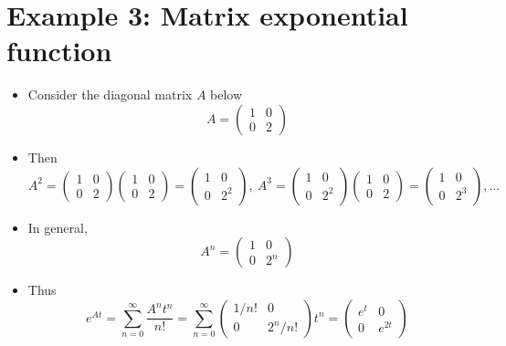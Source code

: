 \documentclass[11pt,a4paper]{article}
\begin{document}
	\section*{Example 3: Matrix exponential function}
	\begin{itemize}
		\item Consider the diagonal matrix $A$ below
		$$
		A =
		\begin{pmatrix}
			1 & 0\\
			0 & 2
		\end{pmatrix}
		$$
		\item Then
		$$
		A^2 = 
		\begin{pmatrix}
			1 & 0\\
			0 & 2
		\end{pmatrix}
		\begin{pmatrix}
			1 & 0\\
			0 & 2
		\end{pmatrix} = 
		\begin{pmatrix}
			1 & 0\\
			0 & 2^2
		\end{pmatrix},\ A^3=
		\begin{pmatrix}
			1 & 0\\
			0 & 2^2
		\end{pmatrix}
		\begin{pmatrix}
			1 & 0\\
			0 & 2
		\end{pmatrix} =
		\begin{pmatrix}
			1 & 0\\
			0 & 2^3
		\end{pmatrix},\ldots
		$$
		\item In general,
		$$
		A^n =
		\begin{pmatrix}
			1 & 0\\
			0 & 2^n
		\end{pmatrix}
		$$
		\item Thus
		$$
		e^{At} = \sum_{n=0}^{\infty}\frac{A^nt^n}{n!} = \sum_{n=0}^\infty
		\begin{pmatrix}
			1/n! & 0\\
			0 & 2^n/n!
		\end{pmatrix}t^n =
		\begin{pmatrix}
			e^t & 0\\
			0 & e^{2t}
		\end{pmatrix}
		$$
	\end{itemize}
\end{document}
